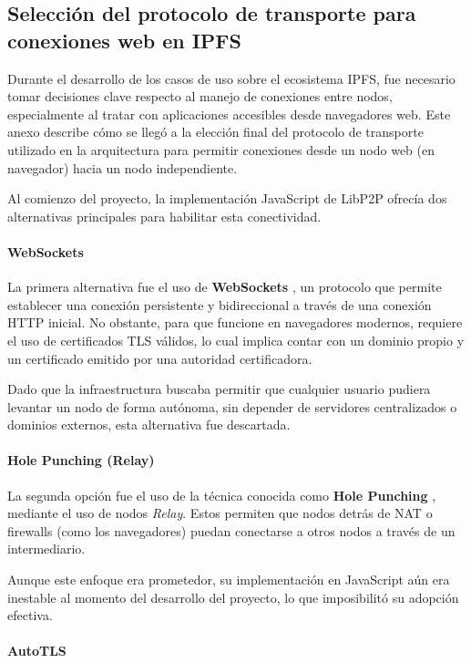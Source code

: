 \subsection{Selección del protocolo de transporte para conexiones web en IPFS}

Durante el desarrollo de los casos de uso sobre el ecosistema IPFS, fue necesario tomar decisiones clave respecto al manejo de conexiones entre nodos, especialmente al tratar con aplicaciones accesibles desde navegadores web. Este anexo describe cómo se llegó a la elección final del protocolo de transporte utilizado en la arquitectura para permitir conexiones desde un nodo web (en navegador) hacia un nodo independiente.

Al comienzo del proyecto, la implementación JavaScript de LibP2P ofrecía dos alternativas principales para habilitar esta conectividad.

\paragraph{WebSockets}

La primera alternativa fue el uso de \textbf{WebSockets} \cite{websocket}, un protocolo que permite establecer una conexión persistente y bidireccional a través de una conexión HTTP inicial. No obstante, para que funcione en navegadores modernos, requiere el uso de certificados TLS válidos, lo cual implica contar con un dominio propio y un certificado emitido por una autoridad certificadora.

Dado que la infraestructura buscaba permitir que cualquier usuario pudiera levantar un nodo de forma autónoma, sin depender de servidores centralizados o dominios externos, esta alternativa fue descartada.

\paragraph{Hole Punching (Relay)}

La segunda opción fue el uso de la técnica conocida como \textbf{Hole Punching} \cite{hole-punching}, mediante el uso de nodos \textit{Relay}. Estos permiten que nodos detrás de NAT o firewalls (como los navegadores) puedan conectarse a otros nodos a través de un intermediario. 

Aunque este enfoque era prometedor, su implementación en JavaScript aún era inestable al momento del desarrollo del proyecto, lo que imposibilitó su adopción efectiva.

\paragraph{AutoTLS}

